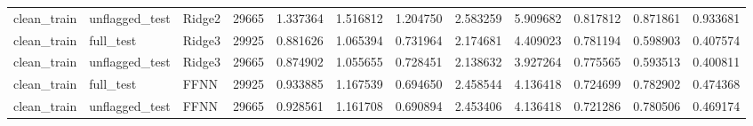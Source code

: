 \begin{tabular}{lllrrrrrrrrr}
clean_train & unflagged_test & Ridge2 & 29665 & 1.337364 & 1.516812 & 1.204750 & 2.583259 & 5.909682 & 0.817812 & 0.871861 & 0.933681 \\
clean_train & full_test & Ridge3 & 29925 & 0.881626 & 1.065394 & 0.731964 & 2.174681 & 4.409023 & 0.781194 & 0.598903 & 0.407574 \\
clean_train & unflagged_test & Ridge3 & 29665 & 0.874902 & 1.055655 & 0.728451 & 2.138632 & 3.927264 & 0.775565 & 0.593513 & 0.400811 \\
clean_train & full_test & FFNN & 29925 & 0.933885 & 1.167539 & 0.694650 & 2.458544 & 4.136418 & 0.724699 & 0.782902 & 0.474368 \\
clean_train & unflagged_test & FFNN & 29665 & 0.928561 & 1.161708 & 0.690894 & 2.453406 & 4.136418 & 0.721286 & 0.780506 & 0.469174 \\
\bottomrule
\end{tabular}
